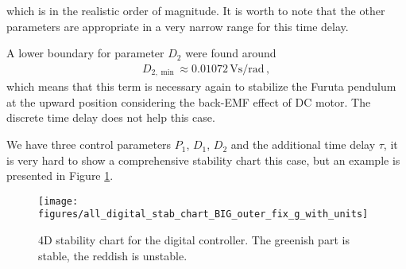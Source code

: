 \noindent which is in the realistic order of magnitude. It is worth to note that the other parameters are appropriate in a very narrow range for this time delay.

A lower boundary for parameter $D_2$ were found around
\begin{align}
	D_{2,\min}\approx 0.01072\,\mathrm{Vs/rad}\,,
\end{align}
which means that this term is necessary again to stabilize the Furuta pendulum at the upward position considering the back-EMF effect of DC motor. The discrete time delay does not help this case.

We have three control parameters $P_1$, $D_1$, $D_2$ and the additional time delay $\tau$, it is very hard to show a comprehensive stability chart this case, but an example is presented in Figure \ref{fig:digit_cont_stab_chart}.
\begin{figure}[b!]
	\centering
	\texttt{[image: figures/all\_digital\_stab\_chart\_BIG\_outer\_fix\_g\_with\_units]}
	\hspace{-1.8em}
	\caption{4D stability chart for the digital \PDD{} controller. The greenish part is stable, the reddish is unstable.}
	\label{fig:digit_cont_stab_chart}
\end{figure}


